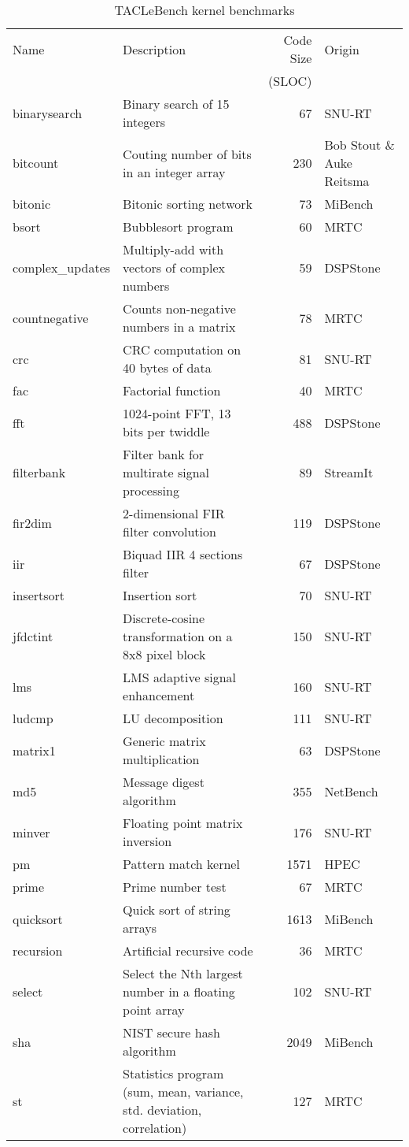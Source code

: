 \documentclass[a4paper,UKenglish]{oasics}
\begin{document}
\begin{table}[t!]
\centering
\caption{\label{tab:bench_kernel}TACLeBench kernel benchmarks}
\begin{tabular}{lL{5.5cm}rR{2.5cm}}
\toprule
Name & Description & Code Size & Origin\\
     &             &     (SLOC) & \\ \midrule
binarysearch & Binary search of 15 integers & 67 & SNU-RT \\
bitcount & Couting number of bits in an integer array & 230  & Bob Stout \& Auke Reitsma\\
bitonic &  Bitonic sorting network  & 73 & MiBench \\
bsort & Bubblesort program & 60 & MRTC \\
complex\_updates &  Multiply-add with vectors of complex numbers & 59 & DSPStone \\
countnegative &  Counts non-negative numbers in a matrix  & 78 & MRTC \\
crc &  CRC computation on 40 bytes of data  & 81 & SNU-RT \\
fac &  Factorial function & 40 & MRTC \\
fft &  1024-point FFT, 13 bits per twiddle  & 488  & DSPStone \\
filterbank & Filter bank for multirate signal processing  & 89 & StreamIt \\
fir2dim &  2-dimensional FIR filter convolution & 119 & DSPStone \\
iir &  Biquad IIR 4 sections filter & 67 & DSPStone \\
insertsort & Insertion sort & 70 & SNU-RT \\
jfdctint & Discrete-cosine transformation on a 8x8 pixel block  & 150  & SNU-RT \\
lms &  LMS adaptive signal enhancement  & 160  & SNU-RT \\
ludcmp & LU decomposition & 111 & SNU-RT \\
matrix1 &  Generic matrix multiplication  & 63 & DSPStone \\
md5 &  Message digest algorithm & 355  & NetBench \\
minver & Floating point matrix inversion  & 176  & SNU-RT \\
pm & Pattern match kernel & 1571  & HPEC \\
prime &  Prime number test  & 67 & MRTC \\
quicksort &  Quick sort of string arrays  & 1613 & MiBench \\
recursion &  Artificial recursive code  & 36 & MRTC \\
select & Select the Nth largest number in a floating point array  & 102 & SNU-RT \\
sha &  NIST secure hash algorithm & 2049  & MiBench \\
st & Statistics program (sum, mean, variance, std. deviation, correlation)  & 127  & MRTC \\
\bottomrule
\end{tabular}
\end{table}
\end{document}
